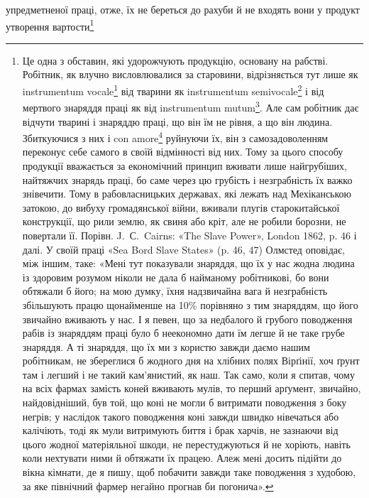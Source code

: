 \parcont{}  %
упредметненої праці, отже, їх не береться до рахуби й не входять
вони у продукт утворення вартости\footnote{
Це одна з обставин, які удорожчують продукцію, основану на
рабстві. Робітник, як влучно висловлювалися за старовини, відрізняється
тут лише як instrumentum vocale\footnote*{
знаряддя, обдароване мовою. \emph{Ред.}
} від тварини як instrumentum semivocale\footnote*{
знаряддя, обдарованого голосом. \emph{Ред.}
} і від мертвого знаряддя праці як від instrumentum mutum\footnote*{
знаряддя німого. \emph{Ред.}
}. Але сам робітник дає відчути тварині і знаряддю праці, що він їм не
рівня, а що він людина. Збиткуючися з них і con amore\footnote*{
з насолодою. \emph{Ред.}
} руйнуючи їх, він з самозадоволенням переконує себе самого в своїй відмінності
від них. Тому за цього способу продукції вважається за економічний принцип
вживати лише найгрубіших, найтяжчих знарядь праці, бо саме через
цю грубість і незграбність їх важко знівечити. Тому в рабовласницьких
державах, які лежать над Мехіканською затокою, до вибуху громадянської
війни, вживали плугів старокитайської конструкції, що рили землю,
як свиня або кріт, але не робили борозни, не повертали її. Порівн.
J.~С.~Cairns: «The Slave Power», London 1862, p. 46 і далі. У своїй праці
«Sea Bord Slave States» (p. 46, 47) Олмстед оповідає, між іншим, таке:
«Мені тут показували знаряддя, що їх у нас жодна людина із здоровим
розумом ніколи не дала б найманому робітникові, бо вони обтяжали б
його; на мою думку, їхня надзвичайна вага й незграбність збільшують
працю щонайменше на 10\% порівняно з тим знаряддям, що його звичайно
вживають у нас. І я певен, що за недбалого й грубого поводження рабів
із знаряддям праці було б неекономно дати їм легше й не таке грубе знаряддя.
А ті знаряддя, що їх ми з користю завжди даємо нашим робітникам,
не збереглися б жодного дня на хлібних полях Вірґінії, хоч ґрунт там
і легший і не такий кам’янистий, як наш. Так само, коли я спитав, чому
на всіх фармах замість коней вживають мулів, то перший арґумент, звичайно,
найдовідніший, був той, що коні не могли б витримати поводження
з боку негрів; у наслідок такого поводження коні завжди швидко нівечаться
або калічіють, тоді як мули витримують биття і брак харчів, не
зазнаючи від цього жодної матеріяльної шкоди, не перестуджуються й не
хоріють, навіть коли нехтувати ними й обтяжати їх працею. Алеж мені
досить підійти до вікна кімнати, де я пишу, щоб побачити завжди таке
поводження з худобою, за яке північний фармер негайно прогнав би погонича».
}
